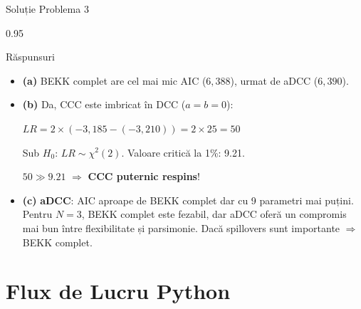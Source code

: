 \documentclass[9pt, aspectratio=169, t]{beamer}
\begin{document}
\begin{frame}{Soluție Problema 3}
    \begin{cminipage}{0.95\textwidth}
    {\footnotesize
    \begin{exampleblock}{Răspunsuri}
        \begin{itemize}\setlength{\itemsep}{0pt}
            \item \textbf{(a)} BEKK complet are cel mai mic AIC ($6{,}388$), urmat de aDCC ($6{,}390$).

            \vspace{0.15cm}

            \item \textbf{(b)} Da, CCC este imbricat în DCC ($a = b = 0$):

            $LR = 2 \times (-3{,}185 - (-3{,}210)) = 2 \times 25 = 50$

            Sub $H_0$: $LR \sim \chi^2(2)$. Valoare critică la 1\%: 9.21.

            $50 \gg 9.21$ $\Rightarrow$ \textbf{CCC puternic respins}!

            \vspace{0.15cm}

            \item \textbf{(c)} \textbf{aDCC}: AIC aproape de BEKK complet dar cu 9 parametri mai puțini. Pentru $N = 3$, BEKK complet este fezabil, dar aDCC oferă un compromis mai bun între flexibilitate și parsimonie. Dacă spillovers sunt importante $\Rightarrow$ BEKK complet.
        \end{itemize}
    \end{exampleblock}
    }
    \end{cminipage}
\end{frame}

\section{Flux de Lucru Python}
\end{document}
